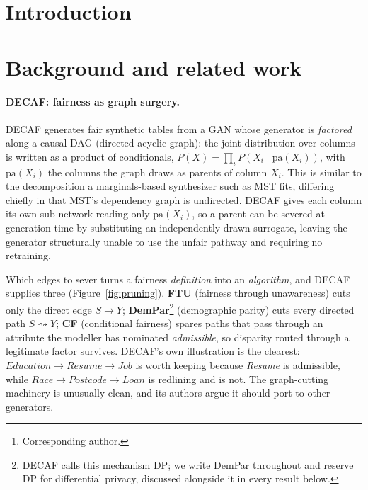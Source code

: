 \documentclass{article}
\title{\wkTitle}
\author{%
  Steven Golob\thanks{Corresponding author.} \\
  University of Washington Tacoma \\
  \texttt{golobs@uw.edu} \\
  \And
  Sikha Pentyala \\
  University of Washington Tacoma \\
  \And
  Martine De Cock \\
  University of Washington Tacoma \\
}
\begin{document}
\maketitle

\begin{abstract}
\wkAbstract
\end{abstract}

\section{Introduction}
\wkIntro

\section{Background and related work}
\label{sec:related}

\paragraph{DECAF: fairness as graph surgery.}
DECAF \citep{vanbreugel2021decaf} generates fair synthetic tables from a GAN
whose generator is \emph{factored} along a causal DAG (directed acyclic
graph): the joint distribution over columns is written as a product of
conditionals, $P(X) = \prod_i P(X_i \mid \mathrm{pa}(X_i))$, with
$\mathrm{pa}(X_i)$ the columns the graph draws as parents of column $X_i$.
This is similar to the decomposition a marginals-based synthesizer such as
MST fits, differing chiefly in that MST's dependency graph is undirected.
DECAF gives each column its own sub-network reading only $\mathrm{pa}(X_i)$,
so a parent can be severed at generation time by substituting an independently
drawn surrogate, leaving the generator structurally unable to use the unfair
pathway and requiring no retraining.

Which edges to sever turns a fairness \emph{definition} into an
\emph{algorithm}, and DECAF supplies three (Figure~\ref{fig:pruning}).
\textbf{FTU} (fairness through unawareness) cuts only the direct edge $S
\rightarrow Y$; \textbf{DemPar}\footnote{DECAF calls this mechanism DP; we
write DemPar throughout and reserve DP for differential privacy, discussed
alongside it in every result below.} (demographic parity) cuts every directed
path $S \rightsquigarrow Y$; \textbf{CF} (conditional fairness) spares paths
that pass through an attribute the modeller has nominated \emph{admissible},
so disparity routed through a legitimate factor survives. DECAF's own
illustration is the clearest: $\textit{Education} \rightarrow \textit{Resume}
\rightarrow \textit{Job}$ is worth keeping because \textit{Resume} is
admissible, while $\textit{Race} \rightarrow \textit{Postcode} \rightarrow
\textit{Loan}$ is redlining and is not. The graph-cutting machinery is
unusually clean, and its authors argue it should port to other generators.
\end{document}
